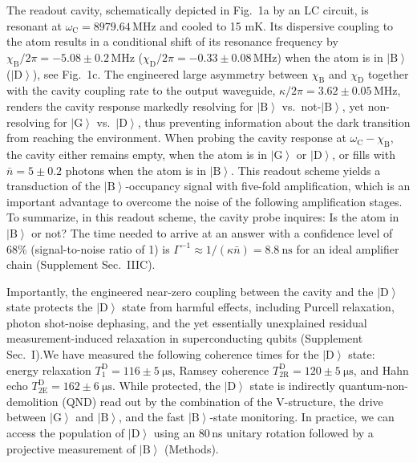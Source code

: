 \documentclass[
	 			preprint,     		superscriptaddress, 																longbibliography,
		amsmath, amssymb,
		aps,  prb,   		floatfix,
		linenumbers     
	]{revtex4-1}
\newcommand{\ket}[1]{\left|#1\right>}
\begin{document}
The readout cavity, schematically depicted in Fig.~1a by an LC circuit, is resonant at $\omega_\mathrm{C} = 8979.64\,\mathrm{MHz}$ and cooled to 15 mK. 
Its dispersive coupling to the atom results in a conditional shift of its resonance frequency by $\chi_\mathrm{B}/2\pi = -5.08 \pm 0.2\,\mathrm{MHz}$ ($\chi_\mathrm{D}/2\pi = -0.33 \pm 0.08\,\mathrm{MHz}$) when the atom is in $\ket{\mathrm{B}}$ ($\ket{\mathrm{D}}$), see Fig.~1c. 
The engineered large asymmetry between $\chi_\mathrm{B}$ and $\chi_\mathrm{D}$ together with the cavity coupling rate to the output waveguide, $\kappa/2\pi = 3.62 \pm 0.05\,\mathrm{MHz}$, renders the cavity response markedly resolving for $\ket{\mathrm{B}}$ vs.~not-$\ket{\mathrm{B}}$, yet non-resolving\cite{Riste2013}  for $\ket{\mathrm{G}}$ vs.~$\ket{\mathrm{D}}$, thus preventing information about the dark transition from reaching the environment.   When probing the cavity response at $\omega_\mathrm{C} - \chi_\mathrm{B}$, the cavity  either remains empty, when the atom is in $\ket{\mathrm{G}}$ or $\ket{\mathrm{D}}$, or fills with $\bar{n}=5 \pm 0.2$ photons  when the atom is in $\ket{\mathrm{B}}$.
This readout scheme yields a transduction of the $\ket{\mathrm{B}}$-occupancy signal with five-fold amplification, which is an important advantage to overcome the noise of the following amplification stages. To summarize, in this readout scheme, the  cavity probe inquires: Is the atom in $\ket{\mathrm{B}}$ or not? The time needed to arrive at an answer with a confidence level of 68\% (signal-to-noise ratio of 1) is $\Gamma^{-1} \approx 1/\left(\kappa \bar{n}\right) = 8.8~\mathrm{ns}$ for an ideal amplifier chain (Supplement Sec.~IIIC).

Importantly, the engineered near-zero coupling between the cavity and the $\ket{\mathrm{D}}$ state protects the $\ket{\mathrm{D}}$ state from harmful effects, including Purcell relaxation, photon shot-noise dephasing, and the yet essentially unexplained residual measurement-induced relaxation in superconducting qubits (Supplement Sec.~I).We have measured the following coherence times for the $\ket{\mathrm{D}}$ state: energy relaxation $T_1^\mathrm{D} = 116 \pm 5~\mathrm{\mu s}$, Ramsey coherence $T_{\mathrm{2R}}^\mathrm{D} = 120 \pm 5~\mathrm{\mu s}$, and Hahn echo $T_\mathrm{2E}^\mathrm{D} = 162 \pm 6~\mathrm{\mu s}$. 
While protected, the $\ket{\mathrm{D}}$ state is indirectly quantum-non-demolition (QND) read out by the combination of the V-structure, the drive between $\ket{\mathrm{G}}$ and $\ket{\mathrm{B}}$, and the fast $\ket{\mathrm{B}}$-state monitoring. In practice, we can access the population of $\ket{\mathrm{D}}$ using an 80\,ns unitary rotation followed by a projective measurement of $\ket{\mathrm{B}}$ (Methods). 
 
\end{document}
